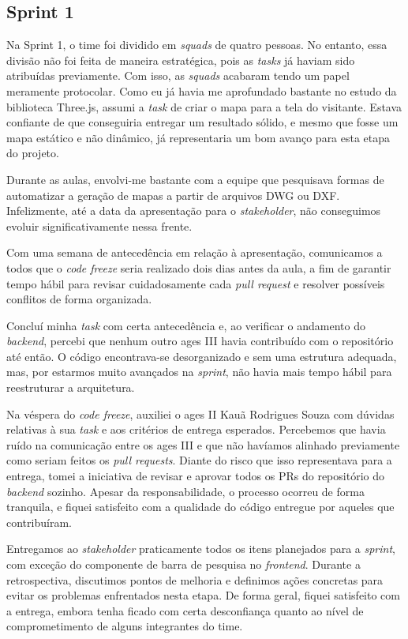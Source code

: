 \subsection{Sprint 1}

Na Sprint 1, o time foi dividido em \textit{squads} de quatro pessoas. No entanto, essa divisão não foi feita de maneira estratégica, pois as \textit{tasks} já haviam sido atribuídas previamente. Com isso, as \textit{squads} acabaram tendo um papel meramente protocolar. Como eu já havia me aprofundado bastante no estudo da biblioteca Three.js, assumi a \textit{task} de criar o mapa para a tela do visitante. Estava confiante de que conseguiria entregar um resultado sólido, e mesmo que fosse um mapa estático e não dinâmico, já representaria um bom avanço para esta etapa do projeto.

Durante as aulas, envolvi-me bastante com a equipe que pesquisava formas de automatizar a geração de mapas a partir de arquivos DWG ou DXF. Infelizmente, até a data da apresentação para o \textit{stakeholder}, não conseguimos evoluir significativamente nessa frente.

Com uma semana de antecedência em relação à apresentação, comunicamos a todos que o \textit{code freeze} seria realizado dois dias antes da aula, a fim de garantir tempo hábil para revisar cuidadosamente cada \textit{pull request} e resolver possíveis conflitos de forma organizada.

Concluí minha \textit{task} com certa antecedência e, ao verificar o andamento do \textit{backend}, percebi que nenhum outro \ac{ages} III havia contribuído com o repositório até então. O código encontrava-se desorganizado e sem uma estrutura adequada, mas, por estarmos muito avançados na \textit{sprint}, não havia mais tempo hábil para reestruturar a arquitetura.

Na véspera do \textit{code freeze}, auxiliei o \ac{ages} II Kauã Rodrigues Souza com dúvidas relativas à sua \textit{task} e aos critérios de entrega esperados. Percebemos que havia ruído na comunicação entre os \ac{ages} III e que não havíamos alinhado previamente como seriam feitos os \textit{pull requests}. Diante do risco que isso representava para a entrega, tomei a iniciativa de revisar e aprovar todos os PRs do repositório do \textit{backend} sozinho. Apesar da responsabilidade, o processo ocorreu de forma tranquila, e fiquei satisfeito com a qualidade do código entregue por aqueles que contribuíram.

Entregamos ao \textit{stakeholder} praticamente todos os itens planejados para a \textit{sprint}, com exceção do componente de barra de pesquisa no \textit{frontend}. Durante a retrospectiva, discutimos pontos de melhoria e definimos ações concretas para evitar os problemas enfrentados nesta etapa. De forma geral, fiquei satisfeito com a entrega, embora tenha ficado com certa desconfiança quanto ao nível de comprometimento de alguns integrantes do time.
